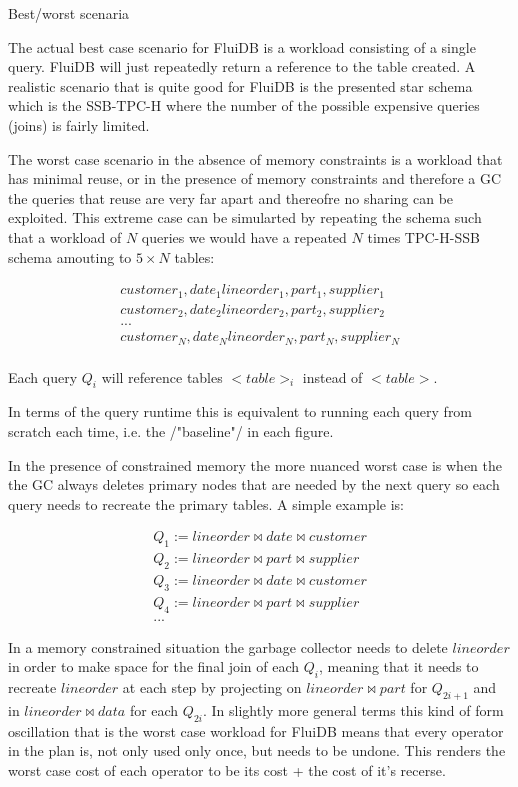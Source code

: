 \begin{correction}{Best/worst scenaria}

The actual best case scenario for FluiDB is a workload consisting of a
single query. FluiDB will just repeatedly return a reference to the
table created. A realistic scenario that is quite good for FluiDB is
the presented star schema which is the SSB-TPC-H where the number of
the possible expensive queries (joins) is fairly limited.

The worst case scenario in the absence of memory constraints is a
workload that has minimal reuse, or in the presence of memory
constraints and therefore a GC the queries that reuse are very far
apart and thereofre no sharing can be exploited. This extreme case can
be simularted by repeating the schema such that a workload of \(N\)
queries we would have a repeated \(N\) times TPC-H-SSB schema amouting
to \(5 \times N\) tables:


\begin{align*}
  customer_1, date_1 lineorder_1, part_1, supplier_1 \\
  customer_2, date_2 lineorder_2, part_2, supplier_2 \\
  ... \\
  customer_N, date_N lineorder_N, part_N, supplier_N \\
\end{align*}

Each query \(Q_i\) will reference tables \(<table>_i\) instead of
\(<table>\).

In terms of the query runtime this is equivalent to running each query
from scratch each time, i.e. the /"baseline"/ in each figure.

In the presence of constrained memory the more nuanced worst case is
when the the GC always deletes primary nodes that are needed by the
next query so each query needs to recreate the primary tables. A
simple example is:


\begin{align*}
  Q_1 := lineorder \Join date \Join customer \\
  Q_2 := lineorder \Join part \Join supplier \\
  Q_3 := lineorder \Join date \Join customer \\
  Q_4 := lineorder \Join part \Join supplier \\
  ...
\end{align*}

In a memory constrained situation the garbage collector needs to
delete \(lineorder\) in order to make space for the final join of each
\(Q_i\), meaning that it needs to recreate \(lineorder\) at each step
by projecting on \(lineorder \Join part\) for \(Q_{2i + 1}\) and in
\(lineorder \Join data\) for each \(Q_{2i}\). In slightly more general
terms this kind of form oscillation that is the worst case workload
for FluiDB means that every operator in the plan is, not only used
only once, but needs to be undone. This renders the worst case cost of
each operator to be its cost + the cost of it's recerse.


\end{correction}
